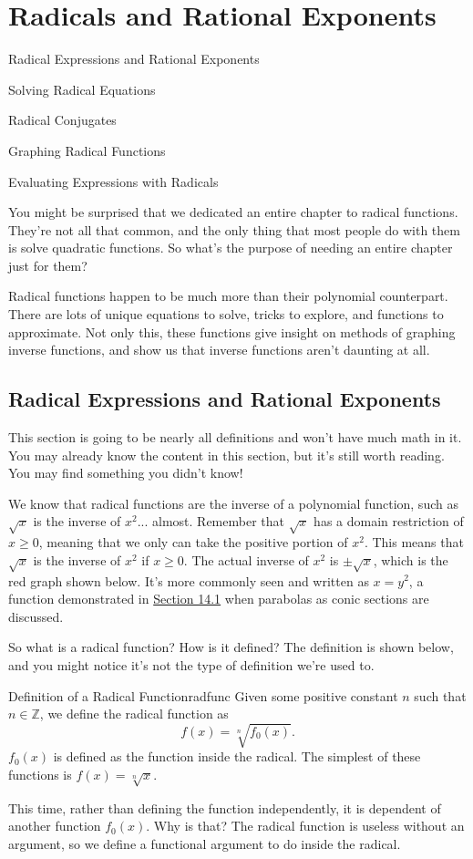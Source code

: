 \documentclass[../book.tex]{subfiles}
\begin{document}
\chapter{Radicals and Rational Exponents}
\begin{introduction}[Contents]
\item Radical Expressions and Rational Exponents
\item Solving Radical Equations
\item Radical Conjugates
\item Graphing Radical Functions
\item Evaluating Expressions with Radicals
\end{introduction}
\noindent You might be surprised that we dedicated an entire chapter to radical functions.  They're not all that common, and the only thing that most people do with them is solve quadratic functions.  So what's the purpose of needing an entire chapter just for them?

Radical functions happen to be much more than their polynomial counterpart.  There are lots of unique equations to solve, tricks to explore, and functions to approximate.  Not only this, these functions give insight on methods of graphing inverse functions, and show us that inverse functions aren't daunting at all.
\section{Radical Expressions and Rational Exponents}
\noindent This section is going to be nearly all definitions and won't have much math in it.  You may already know the content in this section, but it's still worth reading. You may find something you didn't know!

We know that radical functions are the inverse of a polynomial function, such as $\sqrt{x}$ is the inverse of $x^2$... almost.  Remember that $\sqrt{x}$ has a domain restriction of $x\geq 0$, meaning that we only can take the positive portion of $x^2$.  This means that $\sqrt{x}$ is the inverse of $x^2$ if $x\geq 0$.  The actual inverse of $x^2$ is $\pm\sqrt{x}$, which is the red graph shown below.  It's more commonly seen and written as $x=y^2$, a function demonstrated in \hyperlink{section.14.1}{Section 14.1} when parabolas as conic sections are discussed.

So what is a radical function?  How is it defined? The definition is shown below, and you might notice it's not the type of definition we're used to.
\begin{definition}{Definition of a Radical Function}{radfunc}
Given some positive constant $n$ such that $n\in\mathbb{Z}$, we define the radical function as $$f(x)=\sqrt[n]{f_0(x)}.$$ $f_0(x)$ is defined as the function inside the radical. The simplest of these functions is $f(x)=\sqrt[n]{x}$.
\end{definition}
This time, rather than defining the function independently, it is dependent of another function $f_0(x)$.  Why is that? The radical function is useless without an argument, so we define a functional argument to do inside the radical.
\end{document}
